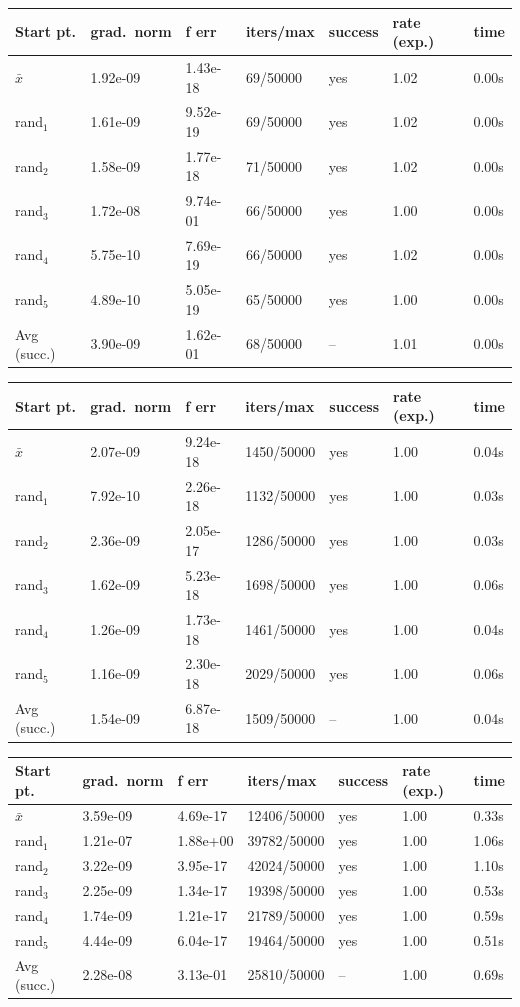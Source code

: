 
\begin{tabular}{lllllll}
\toprule
Start pt. & grad.\ norm & f err & iters/max & success & rate (exp.) & time \\
\midrule
\(\bar{x}\) & 1.92e-09 & 1.43e-18 & 69/50000 & yes & 1.02 & 0.00s \\
rand$_{1}$ & 1.61e-09 & 9.52e-19 & 69/50000 & yes & 1.02 & 0.00s \\
rand$_{2}$ & 1.58e-09 & 1.77e-18 & 71/50000 & yes & 1.02 & 0.00s \\
rand$_{3}$ & 1.72e-08 & 9.74e-01 & 66/50000 & yes & 1.00 & 0.00s \\
rand$_{4}$ & 5.75e-10 & 7.69e-19 & 66/50000 & yes & 1.02 & 0.00s \\
rand$_{5}$ & 4.89e-10 & 5.05e-19 & 65/50000 & yes & 1.00 & 0.00s \\
\midrule
Avg (succ.) & 3.90e-09 & 1.62e-01 & 68/50000 & -- & 1.01 & 0.00s \\
\bottomrule
\end{tabular}

\begin{tabular}{lllllll}
\toprule
Start pt. & grad.\ norm & f err & iters/max & success & rate (exp.) & time \\
\midrule
\(\bar{x}\) & 2.07e-09 & 9.24e-18 & 1450/50000 & yes & 1.00 & 0.04s \\
rand$_{1}$ & 7.92e-10 & 2.26e-18 & 1132/50000 & yes & 1.00 & 0.03s \\
rand$_{2}$ & 2.36e-09 & 2.05e-17 & 1286/50000 & yes & 1.00 & 0.03s \\
rand$_{3}$ & 1.62e-09 & 5.23e-18 & 1698/50000 & yes & 1.00 & 0.06s \\
rand$_{4}$ & 1.26e-09 & 1.73e-18 & 1461/50000 & yes & 1.00 & 0.04s \\
rand$_{5}$ & 1.16e-09 & 2.30e-18 & 2029/50000 & yes & 1.00 & 0.06s \\
\midrule
Avg (succ.) & 1.54e-09 & 6.87e-18 & 1509/50000 & -- & 1.00 & 0.04s \\
\bottomrule
\end{tabular}

\begin{tabular}{lllllll}
\toprule
Start pt. & grad.\ norm & f err & iters/max & success & rate (exp.) & time \\
\midrule
\(\bar{x}\) & 3.59e-09 & 4.69e-17 & 12406/50000 & yes & 1.00 & 0.33s \\
rand$_{1}$ & 1.21e-07 & 1.88e+00 & 39782/50000 & yes & 1.00 & 1.06s \\
rand$_{2}$ & 3.22e-09 & 3.95e-17 & 42024/50000 & yes & 1.00 & 1.10s \\
rand$_{3}$ & 2.25e-09 & 1.34e-17 & 19398/50000 & yes & 1.00 & 0.53s \\
rand$_{4}$ & 1.74e-09 & 1.21e-17 & 21789/50000 & yes & 1.00 & 0.59s \\
rand$_{5}$ & 4.44e-09 & 6.04e-17 & 19464/50000 & yes & 1.00 & 0.51s \\
\midrule
Avg (succ.) & 2.28e-08 & 3.13e-01 & 25810/50000 & -- & 1.00 & 0.69s \\
\bottomrule
\end{tabular}

